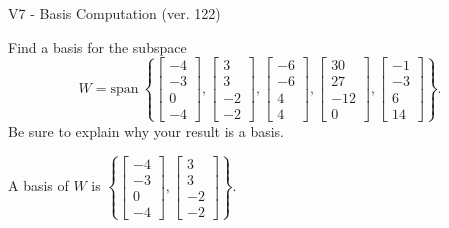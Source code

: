 \begin{exercise}
  \begin{exerciseTitle}V7 - Basis Computation (ver. 122)\end{exerciseTitle}
  \begin{exerciseStatement}
    Find a basis for the subspace 
\[W=\mathrm{span}\ \left\{\left[\begin{array}{r}
-4 \\
-3 \\
0 \\
-4
\end{array}\right] , \left[\begin{array}{r}
3 \\
3 \\
-2 \\
-2
\end{array}\right] , \left[\begin{array}{r}
-6 \\
-6 \\
4 \\
4
\end{array}\right] , \left[\begin{array}{r}
30 \\
27 \\
-12 \\
0
\end{array}\right] , \left[\begin{array}{r}
-1 \\
-3 \\
6 \\
14
\end{array}\right]\right\}.\]
 Be sure to explain why your result is a basis.


  \end{exerciseStatement}
  \begin{exerciseAnswer}
   A basis of \(W\) is  \(\left\{\left[\begin{array}{r}
-4 \\
-3 \\
0 \\
-4
\end{array}\right] , \left[\begin{array}{r}
3 \\
3 \\
-2 \\
-2
\end{array}\right]\right\}\).
  


  \end{exerciseAnswer}
\end{exercise}